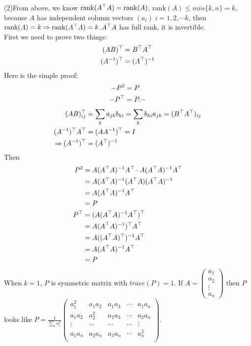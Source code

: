 \documentclass[12pt]{article}
\begin{document}
\medskip
(2)From above, we know $\mathrm{rank}(A^{\top} A) = \mathrm{rank}(A)$. $\mathrm{rank}(A) \leq min \{k, n\} = k$, because $A$ has independent column vectors $(a_i)\; i = 1,2, \cdots k$, then $\mathrm{rank}(A) = k \Rightarrow \mathrm{rank}(A^{\top} A) = k$.$A^{\top} A$ has full rank, it is invertible. \\
 First we need to prove two things:
 \begin{align*}
 (AB)^{\top} &= B^{\top} A^{\top} \\
 (A^{-1})^{\top} &= (A^{\top})^{-1}
 \end{align*}
 Here is the simple proof:
  \begin{align*}
 -P^2 & = P \\
 -P^{\top} & = P.
 -\end{align*} 
\begin{align*}
 (AB)^{\top}_{ij} &= \sum_k a_{jk}b_{ki} = \sum_k b_{ki}a_{jk} = (B^{\top} A^{\top})_{ij} \\
 (A^{-1})^{\top} A^{\top} &= (A A^{-1})^{\top} = I \\
 \Rightarrow (A^{-1})^{\top} &= (A^{\top})^{-1}
 \end{align*}
 Then 
 \begin{align*}
 P^2 &= A(A^{\top}A)^{-1} A^{\top} \cdot A(A^{\top}A)^{-1} A^{\top} \\
 &= A(A^{\top}A)^{-1} (A^{\top} A)(A^{\top}A)^{-1} \\
 &= A(A^{\top}A)^{-1} A^{\top} \\
 &= P \\
 P^{\top} &= ( A ( A^{\top} A)^{-1} A^{\top})^{\top} \\
 &=  A (A^{\top}A)^{-1})^{\top} A^{\top} \\
 &= A ((A^{\top}A)^{\top})^{-1} A^{\top} \\
 &= A(A^{\top}A)^{-1} A^{\top} \\
 &= P
 \end{align*}
 When $k=1$, $P$ is symmetric matrix with $trace(P) = 1$. If $A = 
\begin{pmatrix}
a_1 \\
a_2 \\
\vdots \\
a_n
\end{pmatrix} 
 $ then $P$ looks like $
 P = 
\frac{1}{\sum_i a_i^2}
\begin{pmatrix}
a_1^2 & a_1a_2 & a_1 a_3 & \cdots & a_1a_n \\
a_1a_2 & a_2^2 & a_2 a_3 & \cdots & a_2a_n \\
\vdots & \cdots & \cdots & \cdots & \vdots \\
a_1a_n & a_2a_n & a_3 a_n & \cdots & a_n^2 \\
\end{pmatrix} 
$.
\end{document}
